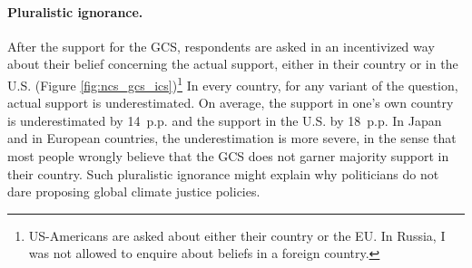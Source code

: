 \documentclass[12pt,english]{article}
\begin{document}
\begin{bibunit}
\paragraph{Pluralistic ignorance.} %
After the support for the GCS, respondents are asked in an incentivized way about their belief concerning the actual support, either in their country or in the U.S. (Figure \ref{fig:ncs_gcs_ics})\footnote{US-Americans are asked about either their country or the EU. In Russia, I was not allowed to enquire about beliefs in a foreign country.} In every country, for any variant of the question, actual support is underestimated. On average, the support in one's own country is underestimated by 14~p.p. and the support in the U.S. by 18~p.p. In Japan and in European countries, the underestimation is more severe, in the sense that most people wrongly believe that the GCS does not garner majority support in their country. Such pluralistic ignorance might explain why politicians do not dare proposing global climate justice policies. %


\end{bibunit}
\end{document}
